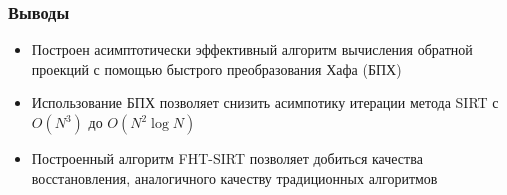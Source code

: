 \begin{frame}
\frametitle{Выводы}
\begin{itemize}
  \item Построен асимптотически эффективный алгоритм вычисления обратной проекций с помощью быстрого преобразования Хафа (БПХ)
  \item Использование БПХ позволяет снизить асимпотику итерации метода SIRT с $O(N^3)$ до $O(N^2 \log N)$
  \item Построенный алгоритм FHT-SIRT позволяет добиться качества восстановления, аналогичного качеству традиционных алгоритмов
\end{itemize}
\end{frame}